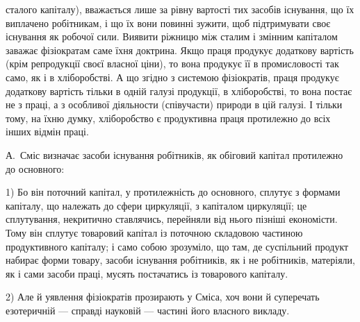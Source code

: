 \parcont{}  %
сталого капіталу), вважається лише за рівну вартості тих засобів існування,
що їх виплачено робітникам, і що їх вони повинні зужити, щоб
підтримувати своє існування як робочої сили. Виявити ріжницю між сталим
і змінним капіталом заважає фізіократам саме їхня доктрина. Якщо
праця продукує додаткову вартість (крім репродукції своєї власної ціни),
то вона продукує її в промисловості так само, як і в хліборобстві. А
що згідно з системою фізіократів, праця продукує додаткову вартість
тільки в одній галузі продукції, в хліборобстві, то вона постає не з праці,
а з особливої діяльности (співучасти) природи в цій галузі. І тільки
тому, на їхню думку, хліборобство є продуктивна праця протилежно до
всіх інших відмін праці.

А.~Сміс визначає засоби існування робітників, як обіговий капітал
протилежно до основного:

1) Бо він поточний капітал, у протилежність до основного, сплутує
з формами капіталу, що належать до сфери циркуляції, з капіталом
циркуляції; це сплутування, некритично ставлячись, перейняли від нього
пізніші економісти. Тому він сплутує товаровий капітал із поточною
складовою частиною продуктивного капіталу; і само собою зрозуміло,
що там, де суспільний продукт набирає форми товару, засоби існування
робітників, як і не робітників, матеріяли, як і сами засоби праці, мусять
постачатись із товарового капіталу.

2) Але й уявлення фізіократів прозирають у Сміса, хоч вони й суперечать
езотеричній — справді науковій — частині його власного викладу.

